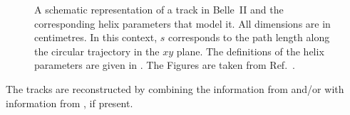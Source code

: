 \begin{figure}[htbp!]
    \centering
    \caption{\label{fig:helix} A schematic representation of a track in Belle~II and the corresponding helix parameters that model it.
    All dimensions are in centimetres.
    In this context, $s$ corresponds to the path length along the circular trajectory in the $xy$ plane.
    The definitions of the helix parameters are given in .
    The Figures are taken from Ref.~\cite{BelleIITrackingGroup:2020hpx}.
    }
\end{figure}
The tracks are reconstructed by combining the information from \CDC and/or \SVD with information from \PXD, if present.

